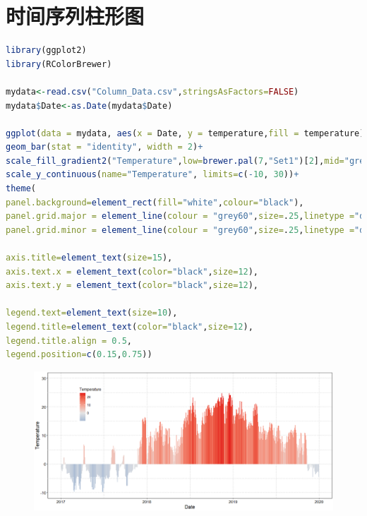 \documentclass[11pt,a4paper,oneside]{book}
\begin{document}
\section{时间序列柱形图}
\begin{lstlisting}[language=r]
library(ggplot2)
library(RColorBrewer)

mydata<-read.csv("Column_Data.csv",stringsAsFactors=FALSE)
mydata$Date<-as.Date(mydata$Date)

ggplot(data = mydata, aes(x = Date, y = temperature,fill = temperature)) +
geom_bar(stat = "identity", width = 2)+
scale_fill_gradient2("Temperature",low=brewer.pal(7,"Set1")[2],mid="grey90",high=brewer.pal(7,"Set1")[1],midpoint=0)+
scale_y_continuous(name="Temperature", limits=c(-10, 30))+
theme(
panel.background=element_rect(fill="white",colour="black"),
panel.grid.major = element_line(colour = "grey60",size=.25,linetype ="dotted" ),
panel.grid.minor = element_line(colour = "grey60",size=.25,linetype ="dotted" ),

axis.title=element_text(size=15),
axis.text.x = element_text(color="black",size=12),
axis.text.y = element_text(color="black",size=12),

legend.text=element_text(size=10),
legend.title=element_text(color="black",size=12),
legend.title.align = 0.5,
legend.position=c(0.15,0.75))
\end{lstlisting}
\begin{figure}[H]
	\centering
	\includegraphics[width=\textwidth]{screenshot048}
\end{figure}
\end{document}
